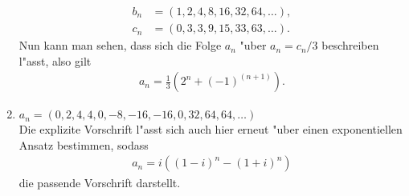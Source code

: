 \documentclass[12pt,answers]{exam}
\begin{document}
\begin{questions}
\begin{solution}
\begin{enumerate}
\begin{align*}
b_n&=(1,2,4,8,16,32,64,\dots),
\\
c_n&=(0,3,3,9,15,33,63,\dots).
\end{align*}
Nun kann man sehen, dass sich die Folge $a_n$ "uber $a_n=c_n/3$ beschreiben l"asst, also gilt
\begin{align*}
a_n=\frac{1}{3}\left(2^n+(-1)^{(n+1)}\right).
\end{align*}
\item $a_n=(0,2,4,4,0,-8,-16,-16,0,32,64,64,\dots)$\\
Die explizite Vorschrift l"asst sich auch hier erneut "uber einen exponentiellen Ansatz bestimmen, sodass
\begin{align*}
a_n=i\left((1-i)^n-(1+i)^n\right)
\end{align*}
die passende Vorschrift darstellt.
\end{enumerate}
\end{solution}





\end{questions}
\end{document}
